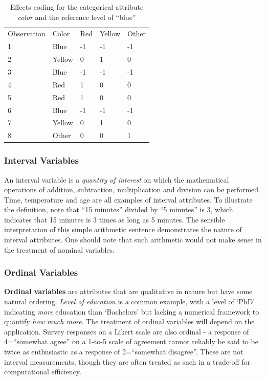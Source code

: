 \documentclass[
  letterpaper,
  DIV=11,
  numbers=noendperiod]{scrreprt}
\begin{document}
\hypertarget{tbl-effcoding}{}
\begin{longtable}[]{@{}lllll@{}}
\caption{\label{tbl-effcoding}Effects coding for the categorical
attribute \emph{color} and the reference level of
``blue''}\tabularnewline
\toprule()
\endhead
Observation & Color & Red & Yellow & Other \\
1 & Blue & -1 & -1 & -1 \\
2 & Yellow & 0 & 1 & 0 \\
3 & Blue & -1 & -1 & -1 \\
4 & Red & 1 & 0 & 0 \\
5 & Red & 1 & 0 & 0 \\
6 & Blue & -1 & -1 & -1 \\
7 & Yellow & 0 & 1 & 0 \\
8 & Other & 0 & 0 & 1 \\
\bottomrule()
\end{longtable}

\hypertarget{interval-variables}{%
\subsubsection*{Interval Variables}\label{interval-variables}}

An interval variable is a \emph{quantity of interest} on which the
mathematical operations of addition, subtraction, multiplication and
division can be performed. Time, temperature and age are all examples of
interval attributes. To illustrate the definition, note that ``15
minutes'' divided by ``5 minutes'' is 3, which indicates that 15 minutes
is 3 times as long as 5 minutes. The sensible interpretation of this
simple arithmetic sentence demonstrates the nature of interval
attributes. One should note that such arithmetic would not make sense in
the treatment of nominal variables.

\hypertarget{ordinal-variables}{%
\subsubsection*{Ordinal Variables}\label{ordinal-variables}}

\textbf{Ordinal variables} are attributes that are qualitative in nature
but have some natural ordering. \emph{Level of education} is a common
example, with a level of `PhD' indicating \emph{more} education than
`Bachelors' but lacking a numerical framework to quantify \emph{how much
more}. The treatment of ordinal variables will depend on the
application. Survey responses on a Likert scale are also ordinal - a
response of 4=``somewhat agree'' on a 1-to-5 scale of agreement cannot
reliably be said to be twice as enthusiastic as a response of
2=``somewhat disagree''. These are not interval measurements, though
they are often treated as such in a trade-off for computational
efficiency.
\end{document}
